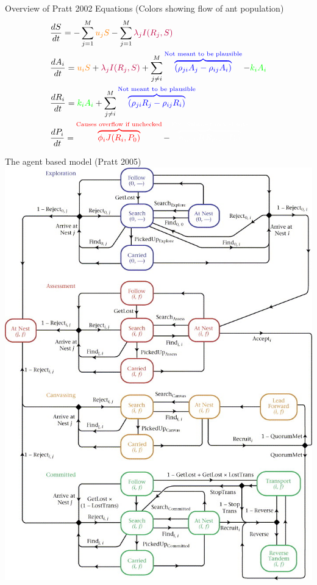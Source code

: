 \documentclass{beamer}
\makeatletter
\def\mcolor#1#{\@mcolor{#1}}
\def\@mcolor#1#2#3{%
  \protect\leavevmode
  \begingroup
    \color#1{#2}#3%
  \endgroup
}
\newcommand{\annotate}[3]{
\mcolor{#1}{\overbrace{#3}^\text{#2}}
}
\makeatother
\begin{document}
   \begin{frame}{Overview of Pratt 2002 Equations (Colors showing flow of ant population)}
       \Large
       \begin{equation}
       \begin{aligned}
           & \frac{dS}{dt} = - \sum_{j=1}^M \mcolor{orange}{u_jS} - \sum_{j=1}^M \mcolor{purple}{\lambda_jI(R_j, S)} \\
           & \frac{dA_i}{dt} = \mcolor{orange}{u_iS} + \mcolor{purple}{\lambda_jI(R_j, S)} + \sum_{j \neq i}^M \annotate{blue}{Not meant to be plausible}{(\rho_{ji}A_j - \rho_{ij}A_i)} - \mcolor{green}{k_iA_i} \\
           & \frac{dR_i}{dt} = \mcolor{green}{k_iA_i} + \sum_{j \neq i}^M \annotate{blue}{Not meant to be plausible}{(\rho_{ji}R_j - \rho_{ij}R_i)} \\
           & \frac{dP_i}{dt} = \annotate{red}{Causes overflow if unchecked}{\phi_iJ(R_i, P_0)} - \annotate{white}{Fix: Subtract moved ants}{\phi_{dest}J(R_{dest},P_0)}
       \end{aligned}
       \end{equation}
   \end{frame}

\begin{frame}{The agent based model (Pratt 2005)}
   \includegraphics[scale=1.6]{agent}
\end{frame}
\end{document}
